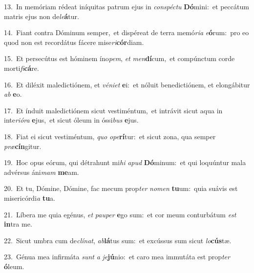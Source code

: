 {\numbfont\textcolor{\numbcolor}{13.}}~In memóriam rédeat iníquitas patrum ejus in \textit{con}\-\textit{spéc}\textit{tu} \textbf{Dó}\-mini:~\star et peccátum matris ejus non de\-\textit{le}\-\textbf{á}tur.\par
{\numbfont\textcolor{\numbcolor}{14.}}~Fiant contra Dóminum semper,~\dagger et dispéreat de terra memó\-\textit{ri}\-\textit{a} \textit{e}\-\textbf{ó}rum:~\star pro eo quod non est recordátus fácere mise\-\textit{ri}\-\textbf{cór}diam.\par
{\numbfont\textcolor{\numbcolor}{15.}}~Et persecútus est hóminem íno\-\textit{pem}\-, \textit{et} \textit{men}\-\textbf{dí}cum,~\star et compúnctum corde morti\-\textit{fi}\-\textbf{cá}re.\par
{\numbfont\textcolor{\numbcolor}{16.}}~Et diléxit maledictiónem, et \textit{vé}\-\textit{ni}\textit{et} \textbf{e}\-i:~\star et nóluit benedictiónem, et elongábitur \textit{ab} \textbf{e}\-o.\par
{\numbfont\textcolor{\numbcolor}{17.}}~Et índuit maledictiónem sicut vestiméntum,~\dagger et intrávit sicut aqua in inte\-\textit{ri}\-\textit{ó}\textit{ra} \textbf{e}\-jus,~\star et sicut óleum in óssi\textit{bus} \textbf{e}\-jus.\par
{\numbfont\textcolor{\numbcolor}{18.}}~Fiat ei sicut vestiméntum, \textit{quo} \textit{o}\-\textit{pe}\textbf{rí}tur:~\star et sicut zona, qua semper \textit{præ}\-\textbf{cín}gitur.\par
{\numbfont\textcolor{\numbcolor}{19.}}~Hoc opus eórum, qui détrahunt mi\textit{hi} \textit{a}\-\textit{pud} \textbf{Dó}\-minum:~\star et qui loquúntur mala advérsus áni\textit{mam} \textbf{me}\-am.\par
{\numbfont\textcolor{\numbcolor}{20.}}~Et tu, Dómine, Dómine, fac mecum prop\textit{ter} \textit{no}\-\textit{men} \textbf{tu}\-um:~\star quia suávis est misericórdi\textit{a} \textbf{tu}\-a.\par
{\numbfont\textcolor{\numbcolor}{21.}}~Líbera me quia egénus, \textit{et} \textit{pau}\-\textit{per} \textbf{e}\-go sum:~\star et cor meum conturbátum \textit{est} \textbf{in}\-tra me.\par
{\numbfont\textcolor{\numbcolor}{22.}}~Sicut umbra cum de\-\textit{clí}\-\textit{nat}, \textit{ab}\-\textbf{lá}tus sum:~\star et excússus sum sicut \textit{lo}\-\textbf{cús}tæ.\par
{\numbfont\textcolor{\numbcolor}{23.}}~Génua mea infirmáta \textit{sunt} \textit{a} \textit{je}\-\textbf{jú}nio:~\star et caro mea immutáta est prop\textit{ter} \textbf{ó}\-leum.\par
